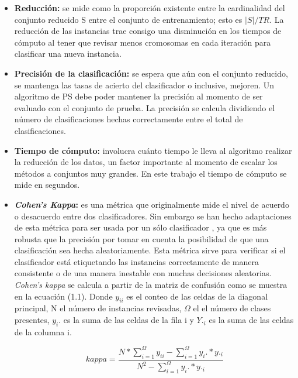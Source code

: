 \begin{itemize}
\item \textbf{Reducción: }
se mide como la proporción existente entre la cardinalidad del conjunto reducido S entre el conjunto de entrenamiento; esto es $|S|/TR$. La reducción de las instancias trae consigo una disminución en los tiempos de cómputo al tener que revisar menos cromosomas en cada iteración para clasificar una nueva instancia. 

\item \textbf{Precisión de la clasificación: }
se espera que aún con el conjunto reducido, se mantenga las tasas de acierto del clasificador o inclusive, mejoren. Un algoritmo de PS debe poder mantener la precisión al momento de ser evaluado con el conjunto de prueba. La precisión se calcula dividiendo el número de clasificaciones hechas correctamente entre el total de clasificaciones.

\item \textbf{Tiempo de cómputo: }
involucra cuánto tiempo le lleva al algoritmo realizar la reducción de los datos, un factor importante al momento de escalar los métodos a conjuntos muy grandes. En este trabajo el tiempo de cómputo se mide en segundos.

\item \textbf{\emph{Cohen's Kappa}: } 
es una métrica que originalmente mide el nivel de acuerdo o desacuerdo entre dos clasificadores. Sin embargo se han hecho adaptaciones de esta métrica para ser usada por un sólo clasificador \cite{garcia2012prototype}, ya que es más robusta que la precisión por tomar en cuenta la posibilidad de que una clasificación sea hecha aleatoriamente. Esta métrica sirve para verificar si el clasificador está etiquetando las instancias correctamente de manera consistente o de una manera inestable con muchas decisiones aleatorias. \emph{Cohen's kappa} se calcula a partir de la matriz de confusión como se muestra en la ecuación (1.1). Donde $y_{ii}$ es el conteo de las celdas de la diagonal principal, N el número de instancias revisadas, $\Omega$ el el número de clases presentes, $y_i.$ es la suma de las celdas de la fila i y $Y._i$ es la suma de las celdas de la columna i.

\begin{equation} 
kappa = \frac{N*\sum_{i=1}^{\Omega}y_{ii} - \sum_{i=1}^{\Omega}y_i.*y._i}{N^2 - \sum_{i=1}^{\Omega}y_i.*y._i}
\end{equation}

\end{itemize}


